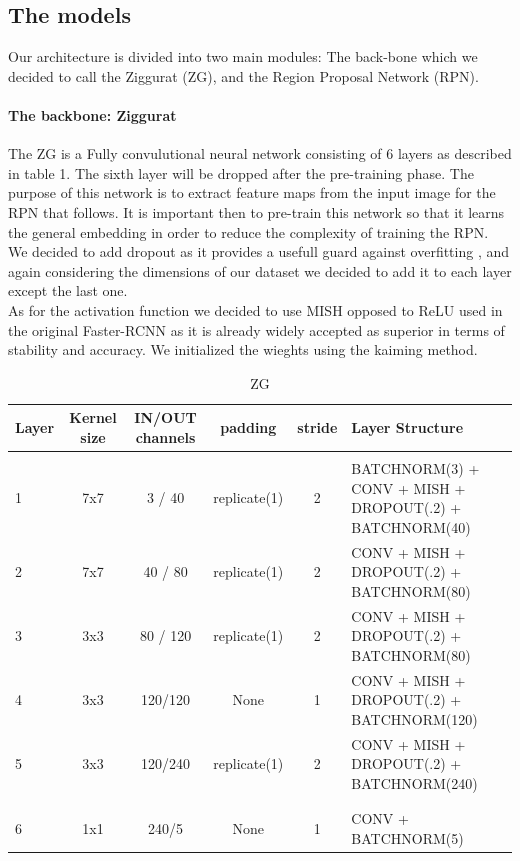 \documentclass[10pt,journal,cspaper,compsoc]{IEEEtran}
\begin{document}
    
    \subsection{The models}
    Our architecture is divided into two main modules: The back-bone which we decided to call the Ziggurat (ZG), and the Region Proposal Network (RPN).\\
    \paragraph{The backbone: Ziggurat}
    The ZG  is a Fully convulutional neural network consisting of 6 layers as described in table 1. The sixth layer will be dropped after the pre-training phase. The purpose of this network is to extract feature maps from the input image for the RPN that follows. It is important then to pre-train this network so that it learns the general embedding in order 
    to reduce the complexity of training the RPN. We decided to add dropout as it provides a usefull guard against overfitting \cite{Srivastava:Dropout}, and again considering the dimensions of our dataset we decided to add it to each layer except the last one.\\ As for the activation function we decided to use MISH opposed to ReLU used in the original Faster-RCNN as it is already 
    widely accepted as superior in terms of stability and accuracy. We initialized the wieghts using the kaiming method. \cite{arxiv:Kaiming} \\ 
        \begin{table}[htb]
	\begin{center}
		\caption{ZG}
		\label{tab:Table 1}
		\begin{tabular}{l | c | c | c | c |  l}  
			\textbf{Layer} & \textbf{Kernel size} & \textbf{IN/OUT channels} & \textbf{padding} & \textbf{stride} & \textbf{Layer Structure}\\
			\hline 
			& & & & & \\
			1 & 7x7 & 3 / 40 & replicate(1) & 2 & BATCHNORM(3) + CONV + MISH + DROPOUT(.2) + BATCHNORM(40) \\
			2 & 7x7 & 40 / 80 & replicate(1) & 2 & CONV + MISH + DROPOUT(.2) + BATCHNORM(80) \\
			3 & 3x3 & 80 / 120 & replicate(1) & 2 & CONV + MISH + DROPOUT(.2) + BATCHNORM(80) \\ 
			4 & 3x3 & 120/120 & None & 1 & CONV + MISH + DROPOUT(.2) + BATCHNORM(120)  \\
			5 & 3x3 & 120/240 & replicate(1) & 2 & CONV + MISH + DROPOUT(.2) + BATCHNORM(240) \\
			& & & & & \\
			\hline
			& & & & & \\
			6 & 1x1 & 240/5 & None & 1 & CONV + BATCHNORM(5)
		\end{tabular}
	\end{center}
     \end{table}
    
\end{document}

